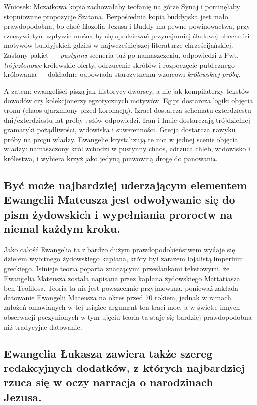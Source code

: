 Wniosek:
Mozaikowa kopia zachowałaby teofanię na górze Synaj i pominęłaby stopniowane propozycje Szatana.
Bezpośrednia kopia buddyjska jest mało prawdopodobna, bo choć filozofia Jezusa i Buddy ma pewne powinowactwa, przy rzeczywistym wpływie można by się spodziewać przynajmniej śladowej obecności motywów buddyjskich gdzieś w najwcześniejszej literaturze chrześcijańskiej.
Zastany pakiet — \emph{pustynna} sceneria tuż po namaszczeniu, odpowiedzi z Pwt, \emph{trójczłonowe} królewskie oferty, odrzucenie skrótów i rozpoczęcie publicznego królowania — dokładnie odpowiada starożytnemu wzorcowi \emph{królewskiej próby}.

A zatem:
ewangeliści piszą jak historycy dworscy, a nie jak kompilatorzy tekstów–dowodów czy kolekcjonerzy egzotycznych motywów.
Egipt dostarcza logiki objęcia tronu (chaos ujarzmiony przed koronacją).
Izrael dostarcza schematu czterdziestu dni/czterdziestu lat próby i słów odpowiedzi.
Iran i Indie dostarczają trójdzielnej gramatyki pożądliwości, widowiska i suwerenności.
Grecja dostarcza nawyku próby na progu władzy.
Ewangelie krystalizują te nici w jednej scenie objęcia władzy: namaszczony król wchodzi w pustynny chaos, odrzuca chleb, widowisko i królestwa, i wybiera krzyż jako jedyną prawowitą drogę do panowania.

\subsection{Być może najbardziej uderzającym elementem Ewangelii Mateusza jest odwoływanie się do pism żydowskich i wypełniania proroctw na niemal każdym kroku.}\label{subsec:possibly-the-most-prominent-element-of-the-gospel-of-matthew-is-the-reference-to-the-jewish-scriptures-and-the-fulfillment-of-the-prophecies-at-seemingly-every-turn.}

Jako całość Ewangelia ta z bardzo dużym prawdopodobieństwem wydaje się dziełem wybitnego żydowskiego kapłana, który był zarazem lojalistą imperium greckiego.
Istnieje teoria poparta znaczącymi przesłankami tekstowymi, że Ewangelia Mateusza została napisana przez kapłana żydowskiego Mattatiasza ben Teofilosa.
Teoria ta nie jest powszechnie przyjmowana, ponieważ zakłada datowanie Ewangelii Mateusza na okres przed 70 rokiem, jednak w ramach założeń omawianych w tej książce argument ten traci moc, a w świetle innych obserwacji poczynionych w tym ujęciu teoria ta staje się bardziej prawdopodobna niż tradycyjne datowanie.

\subsection{Ewangelia Łukasza zawiera także szereg redakcyjnych dodatków, z których najbardziej rzuca się w oczy narracja o narodzinach Jezusa.}\label{subsec:the-gospel-of-luke-also-includes-a-number-of-edits-most-notably-the-birth-narrative-of-jesus.}

